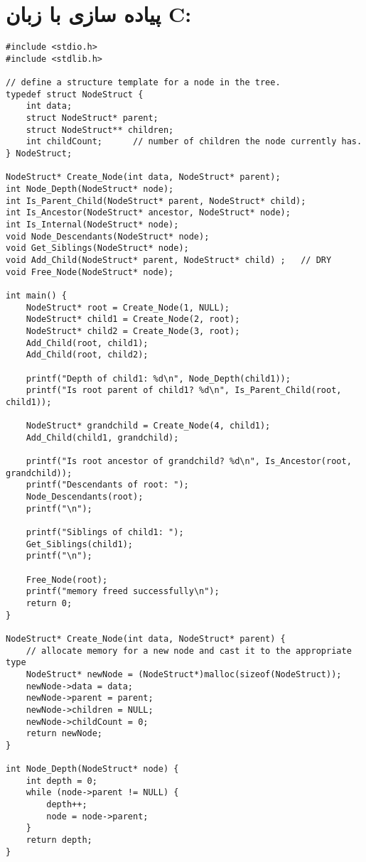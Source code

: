 \documentclass{article}
\begin{document}
\section{پیاده سازی با زبان C:}
\begin{latin}
\begin{lstlisting}[caption={Tree implementation in C language}]
#include <stdio.h>
#include <stdlib.h>

// define a structure template for a node in the tree.
typedef struct NodeStruct {
	int data;
	struct NodeStruct* parent;
	struct NodeStruct** children;
	int childCount;      // number of children the node currently has.
} NodeStruct;

NodeStruct* Create_Node(int data, NodeStruct* parent);
int Node_Depth(NodeStruct* node);
int Is_Parent_Child(NodeStruct* parent, NodeStruct* child);
int Is_Ancestor(NodeStruct* ancestor, NodeStruct* node);
int Is_Internal(NodeStruct* node);
void Node_Descendants(NodeStruct* node);
void Get_Siblings(NodeStruct* node);
void Add_Child(NodeStruct* parent, NodeStruct* child) ;   // DRY
void Free_Node(NodeStruct* node);

int main() {
	NodeStruct* root = Create_Node(1, NULL);
	NodeStruct* child1 = Create_Node(2, root);
	NodeStruct* child2 = Create_Node(3, root);
	Add_Child(root, child1);
	Add_Child(root, child2);
	
	printf("Depth of child1: %d\n", Node_Depth(child1));
	printf("Is root parent of child1? %d\n", Is_Parent_Child(root, child1));
	
	NodeStruct* grandchild = Create_Node(4, child1);
	Add_Child(child1, grandchild);
	
	printf("Is root ancestor of grandchild? %d\n", Is_Ancestor(root, grandchild));
	printf("Descendants of root: ");
	Node_Descendants(root);
	printf("\n");
	
	printf("Siblings of child1: ");
	Get_Siblings(child1);
	printf("\n");
	
	Free_Node(root);
	printf("memory freed successfully\n");
	return 0;
}

NodeStruct* Create_Node(int data, NodeStruct* parent) {
	// allocate memory for a new node and cast it to the appropriate type
	NodeStruct* newNode = (NodeStruct*)malloc(sizeof(NodeStruct));
	newNode->data = data;
	newNode->parent = parent;
	newNode->children = NULL;
	newNode->childCount = 0;
	return newNode;
}

int Node_Depth(NodeStruct* node) {
	int depth = 0;
	while (node->parent != NULL) {
		depth++;
		node = node->parent;
	}
	return depth;
}


\end{lstlisting}
\end{latin}
\end{document}
